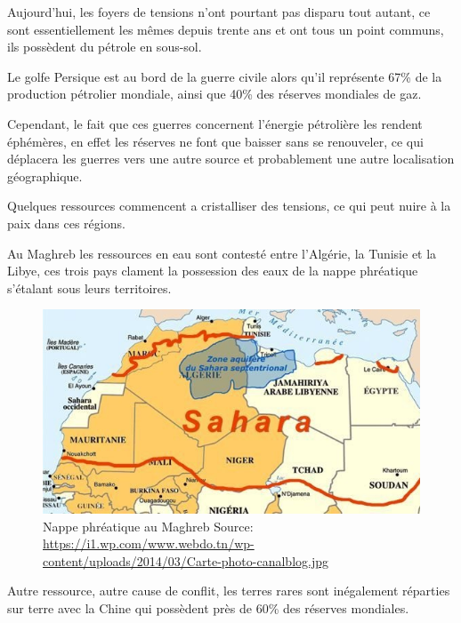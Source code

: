 Aujourd'hui, les foyers de tensions n’ont pourtant pas disparu tout autant,
ce sont essentiellement les mêmes depuis trente ans et ont tous un point communs,
ils possèdent du pétrole en sous-sol.

Le golfe Persique est au bord de la guerre civile alors qu'il représente 67\%
de la production pétrolier mondiale, ainsi que 40\% des réserves mondiales de gaz.

Cependant, le fait que ces guerres concernent l'énergie pétrolière les rendent éphémères,
en effet les réserves ne font que baisser sans se renouveler, ce qui déplacera les
guerres vers une autre source et probablement une autre localisation géographique.

Quelques ressources commencent a cristalliser des tensions, ce qui peut nuire à la paix
dans ces régions.

Au Maghreb les ressources en eau sont contesté entre l'Algérie, la Tunisie et la Libye, ces
trois pays clament la possession des eaux de la nappe phréatique s'étalant sous leurs
territoires.

\begin{figure}
  \centering
  \includegraphics[scale=0.35]{media/zone_aquifere_sahara.jpg}
  \caption{
    Nappe phréatique au Maghreb\newline
      \tiny{Source:\newline
        \url{https://i1.wp.com/www.webdo.tn/wp-content/uploads/2014/03/Carte-photo-canalblog.jpg}
      }
  }
  \label{fig:zone_aquifere_sahara}
\end{figure}

Autre ressource, autre cause de conflit, les terres rares sont inégalement réparties
sur terre avec la Chine qui possèdent près de 60\% des réserves mondiales.

